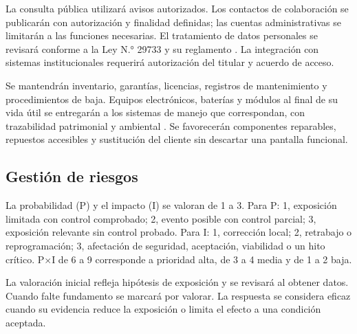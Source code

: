 La consulta pública utilizará avisos autorizados. Los contactos de colaboración se publicarán con autorización y finalidad definidas; las cuentas administrativas se limitarán a las funciones necesarias. El tratamiento de datos personales se revisará conforme a la Ley N.° 29733 y su reglamento \cite{datos}. La integración con sistemas institucionales requerirá autorización del titular y acuerdo de acceso.

Se mantendrán inventario, garantías, licencias, registros de mantenimiento y procedimientos de baja. Equipos electrónicos, baterías y módulos al final de su vida útil se entregarán a los sistemas de manejo que correspondan, con trazabilidad patrimonial y ambiental \cite{raee}. Se favorecerán componentes reparables, repuestos accesibles y sustitución del cliente sin descartar una pantalla funcional.

\subsection{Gestión de riesgos}
La probabilidad (P) y el impacto (I) se valoran de 1 a 3. Para P: 1, exposición limitada con control comprobado; 2, evento posible con control parcial; 3, exposición relevante sin control probado. Para I: 1, corrección local; 2, retrabajo o reprogramación; 3, afectación de seguridad, aceptación, viabilidad o un hito crítico. P$\times$I de 6 a 9 corresponde a prioridad alta, de 3 a 4 media y de 1 a 2 baja.

La valoración inicial refleja hipótesis de exposición y se revisará al obtener datos. Cuando falte fundamento se marcará por valorar. La respuesta se considera eficaz cuando su evidencia reduce la exposición o limita el efecto a una condición aceptada.


